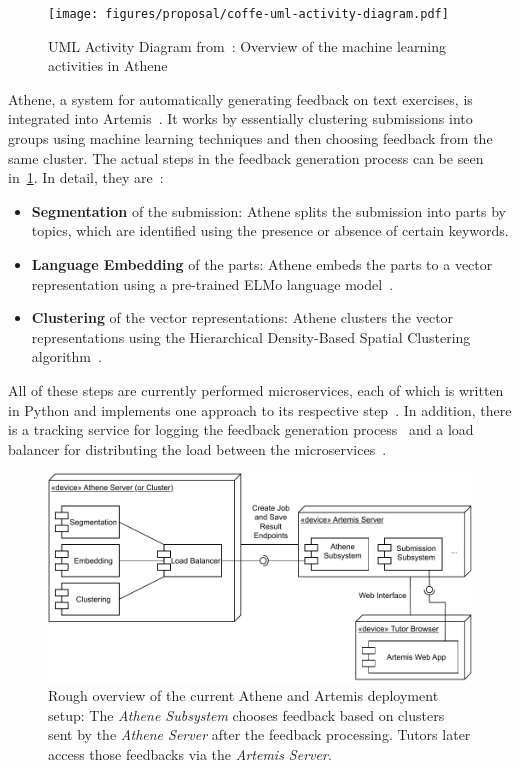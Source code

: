 \begin{figure}[ht]
    \centering
    \texttt{[image: figures/proposal/coffe-uml-activity-diagram.pdf]}
    \caption{UML Activity Diagram from~\cite{cofee}: Overview of the machine learning activities in Athene}
    \label{fig:coffeeUmlActivityDiagram}
\end{figure}

Athene, a system for automatically generating feedback on text exercises, is integrated into Artemis~\cite{cofee}. It works by essentially clustering submissions into groups using machine learning techniques and then choosing feedback from the same cluster. The actual steps in the feedback generation process can be seen in~\cref{fig:coffeeUmlActivityDiagram}. In detail, they are~\cite{cofee}:
\begin{itemize}
    \item \textbf{Segmentation} of the submission: Athene splits the submission into parts by topics, which are identified using the presence or absence of certain keywords.
    \item \textbf{Language Embedding} of the parts: Athene embeds the parts to a vector representation using a pre-trained ELMo language model~\cite{deepContextualizedWordRepresentations}.
    \item \textbf{Clustering} of the vector representations: Athene clusters the vector representations using the Hierarchical Density-Based Spatial Clustering algorithm~\cite{hdbsc}.
\end{itemize}

All of these steps are currently performed microservices, each of which is written in Python and implements one approach to its respective step~\cite{cofee}.
In addition, there is a tracking service for logging the feedback generation process~\cite{atheneTracking} and a load balancer for distributing the load between the microservices~\cite{atheneLoadBalancer}.

\begin{figure}[ht]
    \centering
    \includegraphics[width=0.8\linewidth]{figures/proposal/deployment-diagram.pdf}
    \caption{Rough overview of the current Athene and Artemis deployment setup: The \textit{Athene Subsystem} chooses feedback based on clusters sent by the \textit{Athene Server} after the feedback processing. Tutors later access those feedbacks via the \textit{Artemis Server}.}
    \label{fig:atheneArtemisDeployment}
\end{figure}

